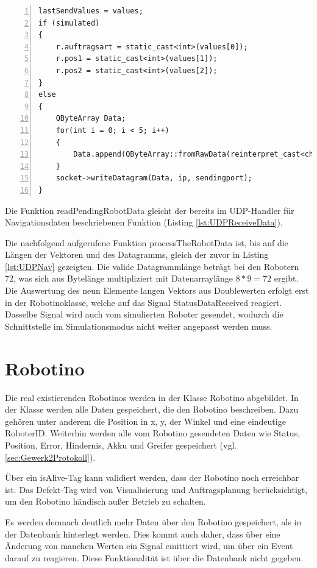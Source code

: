 \begin{lstlisting}[frame=single, breaklines=true, numbers=left, stepnumber=2, firstnumber=1, numberstyle = \tiny, caption=Daten über UDP verschicken,label=lst:UDPWriteData]
lastSendValues = values;
if (simulated)
{
    r.auftragsart = static_cast<int>(values[0]);
    r.pos1 = static_cast<int>(values[1]);
    r.pos2 = static_cast<int>(values[2]);
}
else
{
    QByteArray Data;
    for(int i = 0; i < 5; i++)
    {
        Data.append(QByteArray::fromRawData(reinterpret_cast<char*>(&values[i]), sizeof(values[i])));
    }
    socket->writeDatagram(Data, ip, sendingport);
}
\end{lstlisting}

Die Funktion readPendingRobotData gleicht der bereits im UDP-Handler für Navigationsdaten beschriebenen Funktion (Listing \ref{lst:UDPReceiveData}). 

Die nachfolgend aufgerufene Funktion processTheRobotData ist, bis auf die Längen der Vektoren und des Datagramms, gleich der zuvor in Listing \ref{lst:UDPNav} gezeigten. Die valide Datagrammlänge beträgt bei den Robotern 72, was sich aus Bytelänge multipliziert mit Datenarraylänge $ 8 * 9 = 72$ ergibt. Die Auswertung des neun Elemente langen Vektors aus Doublewerten erfolgt erst in der Robotinoklasse, welche auf das Signal StatusDataReceived reagiert. Dasselbe Signal wird auch vom simulierten Roboter gesendet, wodurch die Schnittstelle im Simulationsmodus nicht weiter angepasst werden muss. 

\section{Robotino} 
\label{sec:Robotino}

Die real existierenden Robotinos werden in der Klasse Robotino abgebildet. In der Klasse werden alle Daten gespeichert, die den Robotino beschreiben. Dazu gehören unter anderem die Position in x, y, der Winkel und eine eindeutige RoboterID. Weiterhin werden alle vom Robotino gesendeten Daten wie Status, Position, Error, Hindernis, Akku und Greifer gespeichert (vgl. \ref{sec:Gewerk2Protokoll}). 

Über ein isAlive-Tag kann validiert werden, dass der Robotino noch erreichbar ist. Das Defekt-Tag wird von Visualisierung und Auftragsplanung berücksichtigt, um den Robotino händisch außer Betrieb zu schalten. 

Es werden demnach deutlich mehr Daten über den Robotino gespeichert, als in der Datenbank hinterlegt werden. Dies kommt auch daher, dass über eine Änderung von manchen Werten ein Signal emittiert wird, um über ein Event darauf zu reagieren. Diese Funktionalität ist über die Datenbank nicht gegeben. 

